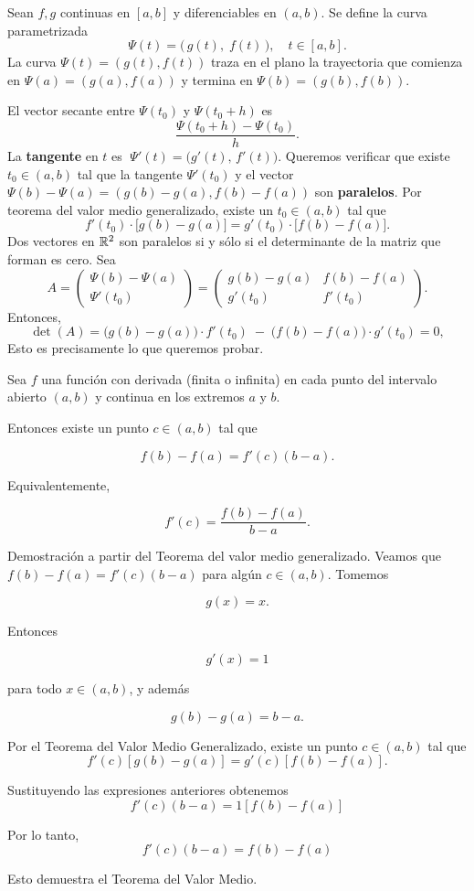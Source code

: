\begin{remark}
    Sean $f, g$ continuas en $[a,b]$ y diferenciables en $(a,b)$.
Se define la curva parametrizada
\[
    \Psi(t) = \bigl(\,g(t),\; f(t)\,\bigr), \quad t \in [a,b].
\]
\noindent La curva $\Psi(t)=(g(t),f(t))$ traza en el plano la trayectoria
que comienza en $\Psi(a)=(g(a),f(a))$ y termina en $\Psi(b)=(g(b),f(b))$.



El vector secante entre $\Psi(t_0)$ y $\Psi(t_0 + h)$ es
\[
    \frac{\Psi(t_0 + h) - \Psi(t_0)}{h}.
\]
 La \textbf{tangente} en $t$ es $\;\Psi'(t) = \bigl(g'(t),\, f'(t)\bigr)$.
 Queremos verificar que existe $t_0 \in (a,b)$ tal que la tangente
$\Psi'(t_0)$ y el vector$\Psi(b)-\Psi(a)=(g(b)-g(a), f(b)-f(a))$ son \textbf{paralelos}. 
Por teorema del valor medio generalizado, existe un $t_0 \in (a,b)$ tal que 
\[
\boxed{
    f'(t_0)\cdot\bigl[g(b)-g(a)\bigr] = g'(t_0)\cdot\bigl[f(b)-f(a)\bigr].
}
\]
Dos vectores en $\mathbb{R}^2$ son paralelos si y s\'olo si el determinante
de la matriz que forman es cero. Sea 
\[
    A = \begin{pmatrix} \Psi(b)-\Psi(a) \\[4pt] \Psi'(t_0) \end{pmatrix}
      = \begin{pmatrix} g(b)-g(a) & f(b)-f(a) \\[4pt] g'(t_0) & f'(t_0) \end{pmatrix}.
\]
Entonces,
\[\det(A)=\bigl(g(b)-g(a)\bigr)\cdot f'(t_0) \;-\; \bigl(f(b)-f(a)\bigr)\cdot g'(t_0) = 0,
\]
Esto es precisamente lo que queremos probar.


\end{remark} 

\begin{teorema}
Sea $f$ una función con derivada (finita o infinita) en cada punto del
intervalo abierto $(a,b)$ y continua en los extremos $a$ y $b$.

Entonces existe un punto $c\in(a,b)$ tal que

\[
f(b)-f(a)=f'(c)(b-a).
\]

Equivalentemente,

\[
f'(c)=\frac{f(b)-f(a)}{b-a}.
\]
\end{teorema}
\begin{prueba}
Demostración a partir del Teorema del valor medio generalizado. Veamos que $f(b) - f(a) = f'(c)(b-a)$ para algún $c \in (a,b)$.  Tomemos

\[
g(x)=x.
\]

Entonces

\[
g'(x)=1
\]

para todo $x\in(a,b)$, y además

\[
g(b)-g(a)=b-a.
\]

Por el Teorema del Valor Medio Generalizado, existe un punto
$c\in(a,b)$ tal que
\[
f'(c)[g(b)-g(a)] = g'(c)[f(b)-f(a)].
\]

Sustituyendo las expresiones anteriores obtenemos
\[
f'(c) (b-a) = 1 [f(b)-f(a)]
\]

Por lo tanto,
\[
f'(c)(b-a) = f(b)-f(a)
\]

Esto demuestra el Teorema del Valor Medio.

\end{prueba}

